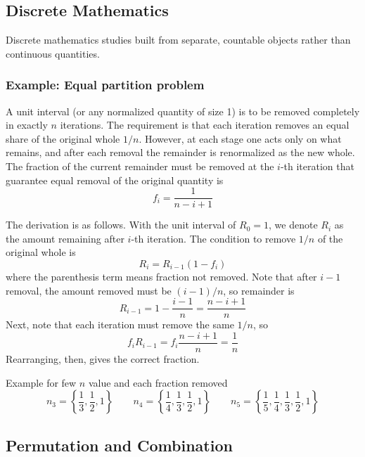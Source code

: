 \documentclass[../../../main.tex]{subfiles}
\begin{document}
\subsection{Discrete Mathematics}
Discrete mathematics studies built from separate, countable objects rather than continuous quantities.

\subsubsection{Example: Equal partition problem}
A unit interval (or any normalized quantity of size 1) is to be removed completely in exactly $n$ iterations. 
The requirement is that each iteration removes an equal share of the original whole $1/n$. 
However, at each stage one acts only on what remains, and after each removal the remainder is renormalized as the new whole. 
The fraction of the current remainder must be removed at the $i$-th iteration that guarantee equal removal of the original quantity is 
\begin{equation*}
    f_i = \frac{1 }{n-i+1}
\end{equation*}

The derivation is as follows.
With the unit interval of $R_0=1$, we denote $R_i$ as the amount remaining after $i$-th iteration.
The condition to remove $1/n$ of the original whole is 
\begin{equation*}
    R_i = R_{i-1} (1-f_i)
\end{equation*}
where the parenthesis term means fraction not removed.
Note that after $i-1$ removal, the amount removed must be $(i-1)/n$, so remainder is 
\begin{equation*}
    R_{i-1} = 1- \frac{i-1 }{n } = \frac{n-i+1 }{n}
\end{equation*}
Next, note that each iteration must remove the same $1/n$, so 
\begin{equation*}
    f_i R_{i-1} = f_i \frac{n-i+1  }{n} = \frac{1 }{n}
\end{equation*}
Rearranging, then, gives the correct fraction.

Example for few $n$ value and each fraction removed
\begin{equation*}
    n_3= \left\{  \frac13,\frac12,1 \right\} \qquad
    n_4 = \left\{ \frac14,\frac13,\frac12,1 \right\} \qquad
    n_5 = \left\{ \frac15,\frac14,\frac13,\frac12,1  \right\} 
\end{equation*}

\subsection{Permutation and Combination}
\end{document}

